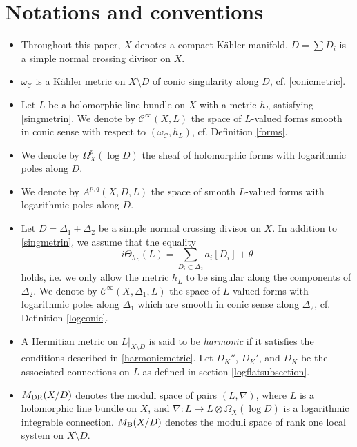 \documentclass[english]{amsart}
\newcommand{\cC}{\mathcal{C}}
\numberwithin{equation}{thm}
\begin{document}
\section*{Notations and conventions}
\begin{itemize}
	\item Throughout this paper, \( X \) denotes a compact K\"ahler manifold, \( D =\sum D_i \) is a simple normal crossing divisor on \( X \).
	
	\item $\omega_\cC$ is a K\"ahler metric on $X \setminus D$ of conic singularity along $D$, cf. \eqref{conicmetric}.
	
	\item Let $L$ be a holomorphic line bundle on $X$ with a metric $h_L$ satisfying \eqref{singmetrin}. 
	We denote by $\cC^\infty(X,L)$  the space of $L$-valued forms smooth in conic sense with respect to $(\omega_\cC, h_L)$, cf. Definition \ref{forms}.
	
	\item We denote by $\Omega^p _X(\log D)$ the sheaf of holomorphic forms with logarithmic poles along $D$. 
	
	\item We denote by $A^{p, q} (X, D, L)$ the space of smooth $L$-valued forms with logarithmic poles along $D$. 
	
	\item Let $D=\Delta_1 +\Delta_2$ be a simple normal crossing divisor on \( X \). In addition to \eqref{singmetrin}, we assume that the equality
		\begin{equation}
		i\Theta_{h_L}(L)=\sum_{D_i\subset \Delta_2} a_i [D_i]+\theta
	\end{equation}
holds, i.e. we only allow the metric $h_L$ to be singular along the components of $\Delta_2$.	
	We denote by $\cC^\infty (X, \Delta_1, L)$ the space of $L$-valued forms with logarithmic poles along $\Delta_1$ which are smooth in conic sense along $\Delta_2$, cf. Definition \ref{logconic}.
	
	\item A Hermitian metric on \( L|_{X\setminus D} \) is said to be \emph{harmonic} if it satisfies the conditions described in \ref{harmonicmetric}. Let \( D_K'' \), \( D_K' \), and \( D_K \) be the associated connections on \( L \) as defined in section \ref{logflatsubsection}.
	
	
	\item \( M_{\rm DR}(X/D) \) denotes the moduli space of pairs \( (L, \nabla) \), where \( L \) is a holomorphic line bundle on \( X \), and \( \nabla: L \to L \otimes \Omega_X(\log D) \) is a logarithmic integrable connection. \( M_{\rm B}(X/D) \) denotes the moduli space of rank one local system on $X\setminus D$.
	

\end{itemize}
\end{document}
